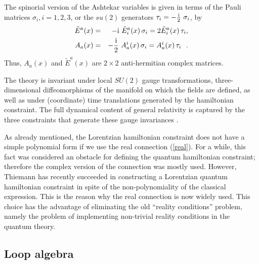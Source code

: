 \documentclass[12pt]{article}
\begin{document}
The spinorial version of the Ashtekar variables is given in terms 
of the Pauli matrices $\sigma_i, i=1,2,3$, or the $su(2)$ 
generators ${\tau_i} = - \frac{{\rm i}}{2} \ {\sigma_i}$, by 
%
\begin{eqnarray}
\tilde{E}^{a}(x) 
        &=& - {\rm i}\ \tilde{E}^a_i(x) \, {\sigma_i}
         =  2 \tilde{E}^a_i(x) \, {\tau_i},  \\
A_{a}(x)&=& - \frac{{\rm i}}{{2}}\ {A}_a^i(x)\, {\sigma_i}
         = {A}_a^i(x)\, {\tau_i}\ \ .
\end{eqnarray}
%
Thus, $A_a(x)$ and $\tilde{E}^a(x)$ are $2\times 2$ 
anti-hermitian complex matrices. 

The theory is invariant under local $SU(2)$ gauge 
transformations, three-dimensional diffeomorphisms of the 
manifold on which the fields are defined, as well as under 
(coordinate) time translations generated by the hamiltonian 
constraint.  The full dynamical content of general relativity is 
captured by the three constraints that generate these gauge 
invariances \cite{Sen,AshtekarBook}.  

As already mentioned, the Lorentzian hamiltonian constraint does 
not have a simple polynomial form if we use the real connection 
(\ref{real}).  For a while, this fact was considered an obstacle 
for defining the quantum hamiltonian constraint; therefore the 
complex version of the connection was mostly used.  However, 
Thiemann has recently succeeded in constructing a Lorentzian 
quantum hamiltonian constraint 
\cite{Thiemann96,Thiemann96b,Thiemann96c} in spite of the 
non-polynomiality of the classical expression.  This is the 
reason why the real connection is now widely used.  This choice 
has the advantage of eliminating the old ``reality conditions'' 
problem, namely the problem of implementing non-trivial reality 
conditions in the quantum theory.

\subsection{Loop algebra} \label{LoopAlgebra}
\end{document}
